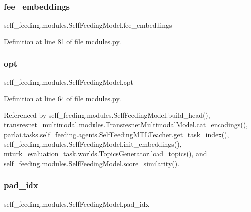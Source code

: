 \subsubsection{\texorpdfstring{fee\+\_\+embeddings}{fee\_embeddings}}
{\footnotesize\ttfamily self\+\_\+feeding.\+modules.\+Self\+Feeding\+Model.\+fee\+\_\+embeddings}



Definition at line 81 of file modules.\+py.

\mbox{\label{classself__feeding_1_1modules_1_1SelfFeedingModel_ad755fa0599d25f8b953de711995116ef}} 
\subsubsection{\texorpdfstring{opt}{opt}}
{\footnotesize\ttfamily self\+\_\+feeding.\+modules.\+Self\+Feeding\+Model.\+opt}



Definition at line 64 of file modules.\+py.



Referenced by self\+\_\+feeding.\+modules.\+Self\+Feeding\+Model.\+build\+\_\+head(), transresnet\+\_\+multimodal.\+modules.\+Transresnet\+Multimodal\+Model.\+cat\+\_\+encodings(), parlai.\+tasks.\+self\+\_\+feeding.\+agents.\+Self\+Feeding\+M\+T\+L\+Teacher.\+get\+\_\+task\+\_\+index(), self\+\_\+feeding.\+modules.\+Self\+Feeding\+Model.\+init\+\_\+embeddings(), mturk\+\_\+evaluation\+\_\+task.\+worlds.\+Topics\+Generator.\+load\+\_\+topics(), and self\+\_\+feeding.\+modules.\+Self\+Feeding\+Model.\+score\+\_\+similarity().

\mbox{\label{classself__feeding_1_1modules_1_1SelfFeedingModel_aa6989e0f40e11a126e49e34eb9eaf238}} 
\subsubsection{\texorpdfstring{pad\+\_\+idx}{pad\_idx}}
{\footnotesize\ttfamily self\+\_\+feeding.\+modules.\+Self\+Feeding\+Model.\+pad\+\_\+idx}



